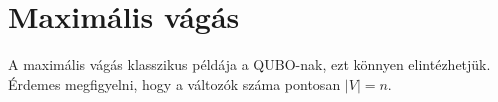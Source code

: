 %
%
%
%
%
%
%
%
%	

\section{Maximális vágás}\label{sec:practiceMaxCut}

A maximális vágás klasszikus példája a QUBO-nak, ezt könnyen elintézhetjük.
Érdemes megfigyelni, hogy a változók száma pontosan $|V|=n$.

